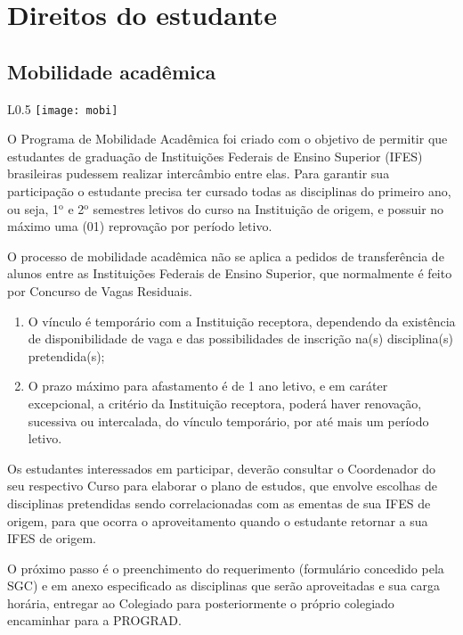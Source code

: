 \chapter{Direitos do estudante}
\section{Mobilidade acadêmica}

    \begin{wrapfigure}{L}{0.5\textwidth}
        \centering
        \texttt{[image: mobi]}
    \end{wrapfigure}

 O Programa de Mobilidade Acadêmica foi criado com o objetivo de permitir que estudantes de graduação de Instituições Federais de Ensino Superior (IFES)  brasileiras pudessem realizar intercâmbio entre elas. Para garantir sua participação o estudante precisa ter cursado todas as disciplinas do primeiro ano, ou seja, 1$^{\mbox{o}}$ e 2$^{\mbox{o}}$ semestres letivos do curso na Instituição de origem, e possuir no máximo uma (01) reprovação por período letivo.

O processo de mobilidade acadêmica não se aplica a pedidos de transferência de alunos entre as Instituições Federais de Ensino Superior, que normalmente é feito por Concurso de Vagas Residuais.
    \begin{enumerate}
        \item O vínculo é temporário com a Instituição receptora, dependendo da existência de disponibilidade de vaga e das possibilidades de inscrição na(s) disciplina(s) pretendida(s);
        \item O prazo máximo para afastamento é de 1 ano letivo, e em caráter excepcional, a critério da Instituição receptora, poderá haver renovação, sucessiva ou intercalada, do vínculo temporário, por até mais um período letivo.
    \end{enumerate}

Os estudantes interessados em participar, deverão consultar o Coordenador do seu respectivo Curso para elaborar o plano de estudos, que envolve escolhas de disciplinas pretendidas sendo correlacionadas com as ementas de sua IFES de origem, para que ocorra o aproveitamento quando o estudante retornar a sua IFES de origem.
   
O próximo passo é o preenchimento do requerimento (formulário concedido pela SGC) e em anexo especificado as disciplinas que serão aproveitadas e sua carga horária, entregar ao Colegiado para posteriormente o próprio colegiado encaminhar para a PROGRAD.

